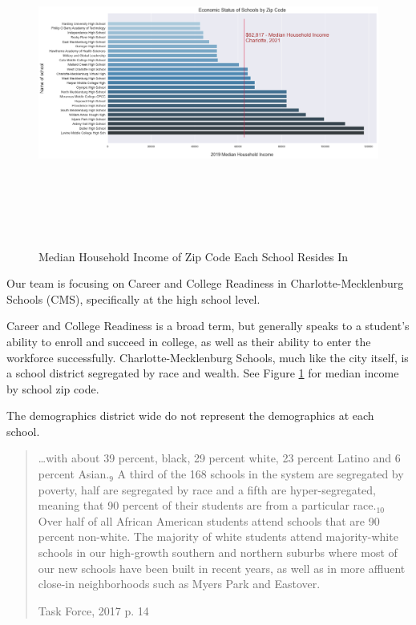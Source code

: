 \begin{figure}
    \caption{Median Household Income of Zip Code Each School Resides In}
    \includegraphics[width=17cm, height=10cm]{school_income.png}
    \label{fig2}
\end{figure}
Our team is focusing on Career and College Readiness in Charlotte-Mecklenburg Schools (CMS), specifically at the high school level. 

Career and College Readiness is a broad term, but generally speaks to a student's ability to enroll and succeed in college, as well as their ability to enter the workforce successfully. Charlotte-Mecklenburg Schools, much like the city itself, is a school district segregated by race and wealth. See Figure \ref{fig2} for median income by school zip code.


The demographics district wide do not represent the demographics at each school. 

\blockquote[Task Force, 2017 p. 14][]{\dots with about 39 percent, black, 29 percent white, 23 percent Latino and 6 percent Asian.\(_{9}\) A third of the 168 schools in the system are segregated by poverty, half are segregated by race and a fifth are hyper-segregated, meaning that 90 percent of their students are from a particular race.\(_{10}\) 
Over half of all African American students attend schools that are 90 percent non-white. 
The majority of white students attend majority-white schools in our high-growth southern and northern suburbs where most of our new schools have been built in recent years, as well as in more affluent close-in neighborhoods such as Myers Park and Eastover.}

